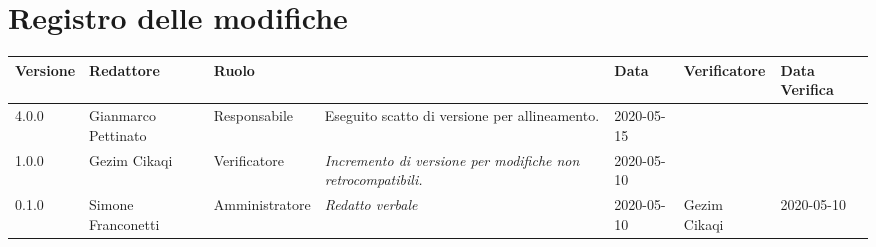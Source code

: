 \section*{Registro delle modifiche}
\renewcommand{\arraystretch}{1.8}

  \setlength\LTleft{-1.7cm}
  \begin{longtable}{|p{1.7cm}|p{2cm}|p{2.5cm}|p{3cm}|p{1.7cm}|p{2cm}|p{2.3cm}|}
    \hline

    \rowcolor{header}
    \textbf{Versione} & \textbf{Redattore} & \textbf{Ruolo} & \centering{\textbf{Descrizione}} & \textbf{Data} & \textbf{Verificatore} & \textbf{Data Verifica}\\

    \hline
	4.0.0 & Gianmarco Pettinato & Responsabile & Eseguito scatto di versione per allineamento. & 2020-05-15 & &\\

    1.0.0 & Gezim Cikaqi & Verificatore & \small{\textit{Incremento di versione per modifiche non retrocompatibili.}} & 2020-05-10 & &\\
	0.1.0 & Simone Franconetti & Amministratore & \small{\textit{Redatto verbale}} & 2020-05-10 & Gezim Cikaqi & 2020-05-10 \\
    \hline
  \end{longtable}
  \setlength\LTleft{0cm}
